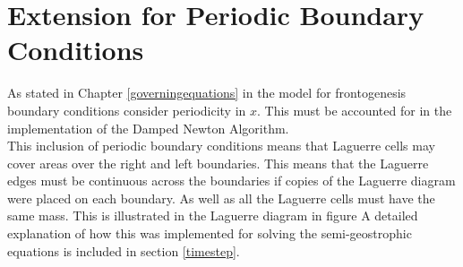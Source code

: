 \section{Extension for Periodic Boundary Conditions}
As stated in Chapter \ref{governingequations} in the model for frontogenesis boundary conditions consider periodicity in $x$. This must be accounted for in the implementation of the Damped Newton Algorithm.
\\
\linebreak
This inclusion of periodic boundary conditions means that Laguerre cells may cover areas over the right and left boundaries. This means that the Laguerre edges must be continuous across the boundaries if copies of the Laguerre diagram were placed on each boundary. As well as all the Laguerre cells must have the same mass. This is illustrated in the Laguerre diagram in figure 
A detailed explanation of how this was implemented for solving the semi-geostrophic equations is included in section \ref{timestep}.\\
\linebreak
{}

